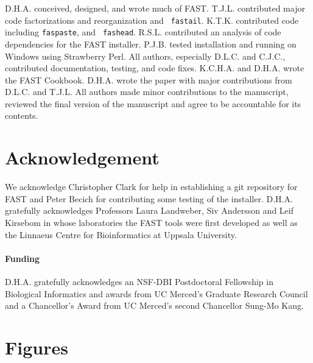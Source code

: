 \documentclass{frontiersSCNS} %
\begin{document}
D.H.A. conceived, designed, and wrote much of FAST. T.J.L. contributed
major code factorizations and reorganization and {\tt
  fastail}. K.T.K. contributed code including {\tt faspaste}, and {\tt
  fashead}. R.S.L. contributed an analysis of code dependencies for
the FAST installer. P.J.B. tested installation and running on Windows
using Strawberry Perl. All authors, especially D.L.C. and C.J.C.,
contributed documentation, testing, and code fixes. K.C.H.A. and
D.H.A. wrote the FAST Cookbook. D.H.A. wrote the paper with major
contributions from D.L.C. and T.J.L. All authors made minor
contributions to the manuscript, reviewed the final version of the
manuscript and agree to be accountable for its contents.

\section*{Acknowledgement}
We acknowledge Christopher Clark for help in establishing a git
repository for FAST and Peter Becich for contributing some testing of
the installer. D.H.A. gratefully acknowledges Professors Laura
Landweber, Siv Andersson and Leif Kirsebom in whose laboratories the
FAST tools were first developed as well as the Linnaeus Centre for
Bioinformatics at Uppsala University.

\paragraph{Funding\textcolon} D.H.A. gratefully acknowledges an
NSF-DBI Postdoctoral Fellowship in Biological Informatics and awards
from UC Merced's Graduate Research Council and a Chancellor's Award
from UC Merced's second Chancellor Sung-Mo Kang.



\section*{Figures}
\end{document}

